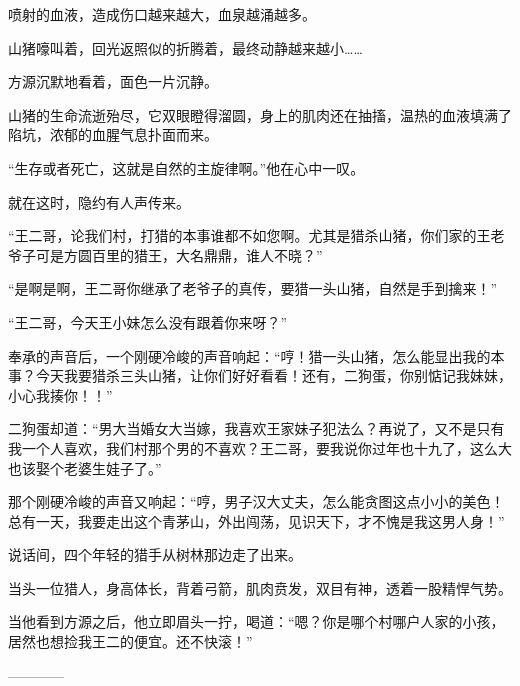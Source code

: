 \begin{this_body}
喷射的血液，造成伤口越来越大，血泉越涌越多。

山猪嚎叫着，回光返照似的折腾着，最终动静越来越小……

方源沉默地看着，面色一片沉静。

山猪的生命流逝殆尽，它双眼瞪得溜圆，身上的肌肉还在抽搐，温热的血液填满了陷坑，浓郁的血腥气息扑面而来。

“生存或者死亡，这就是自然的主旋律啊。”他在心中一叹。

就在这时，隐约有人声传来。

“王二哥，论我们村，打猎的本事谁都不如您啊。尤其是猎杀山猪，你们家的王老爷子可是方圆百里的猎王，大名鼎鼎，谁人不晓？”

“是啊是啊，王二哥你继承了老爷子的真传，要猎一头山猪，自然是手到擒来！”

“王二哥，今天王小妹怎么没有跟着你来呀？”

奉承的声音后，一个刚硬冷峻的声音响起：“哼！猎一头山猪，怎么能显出我的本事？今天我要猎杀三头山猪，让你们好好看看！还有，二狗蛋，你别惦记我妹妹，小心我揍你！！”

二狗蛋却道：“男大当婚女大当嫁，我喜欢王家妹子犯法么？再说了，又不是只有我一个人喜欢，我们村那个男的不喜欢？王二哥，要我说你过年也十九了，这么大也该娶个老婆生娃子了。”

那个刚硬冷峻的声音又响起：“哼，男子汉大丈夫，怎么能贪图这点小小的美色！总有一天，我要走出这个青茅山，外出闯荡，见识天下，才不愧是我这男人身！”

说话间，四个年轻的猎手从树林那边走了出来。

当头一位猎人，身高体长，背着弓箭，肌肉贲发，双目有神，透着一股精悍气势。

当他看到方源之后，他立即眉头一拧，喝道：“嗯？你是哪个村哪户人家的小孩，居然也想捡我王二的便宜。还不快滚！”

------------

\end{this_body}

